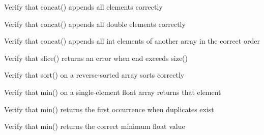 \begin{DoxyRefList}
%
Verify that concat() appends all  elements correctly  
\item[Global \doxylink{test__array_8cpp_acf5b76b0b34a12269c0fa966e7b318df}{TEST\+\_\+F} (\doxylink{classArrayInitTest}{Array\+Init\+Test}, Concat\+Double\+Appends\+Correctly)]\label{test__test000116}%
%
Verify that concat() appends all double elements correctly  
\item[Global \doxylink{test__array_8cpp_a87742c335bea1ccd6f87bbf3bf02f64a}{TEST\+\_\+F} (\doxylink{classArrayInitTest}{Array\+Init\+Test}, Concat\+Int\+Appends\+Correctly)]\label{test__test000115}%
%
Verify that concat() appends all int elements of another array in the correct order  
\item[Global \doxylink{test__array_8cpp_a8672e88636e4a1083f7941bbd4758411}{TEST\+\_\+F} (\doxylink{classArrayInitTest}{Array\+Init\+Test}, Slice\+End\+Exceeds\+Size\+Returns\+Error)]\label{test__test000114}%
%
Verify that slice() returns an error when end exceeds size()  
\item[Global \doxylink{test__array_8cpp_a3c4268741ac142117573f4f962ca871c}{TEST\+\_\+F} (\doxylink{classArrayInitTest}{Array\+Init\+Test}, Sort\+Reverse\+Sorted\+Array)]\label{test__test000141}%
%
Verify that sort() on a reverse-\/sorted array sorts correctly  
\item[Global \doxylink{test__array_8cpp_aeaf0df24ab4d52c170b1872df7c747df}{TEST\+\_\+F} (\doxylink{classArrayInitTest}{Array\+Init\+Test}, Min\+Float\+Single\+Element)]\label{test__test000150}%
%
Verify that min() on a single-\/element float array returns that element  
\item[Global \doxylink{test__array_8cpp_a31fafd54e0a687f76f429020072b05a1}{TEST\+\_\+F} (\doxylink{classArrayInitTest}{Array\+Init\+Test}, Min\+Float\+With\+Duplicates\+Returns\+First)]\label{test__test000149}%
%
Verify that min() returns the first occurrence when duplicates exist  
\item[Global \doxylink{test__array_8cpp_adc2fe36ec7ece65d899d2ecc3e7afae9}{TEST\+\_\+F} (\doxylink{classArrayInitTest}{Array\+Init\+Test}, Min\+Float\+Returns\+Correct\+Value)]\label{test__test000148}%
%
Verify that min() returns the correct minimum float value  
\item[Global \doxylink{test__array_8cpp_a6df6894d9cd7c95e2142a31559b8518a}{TEST\+\_\+F} (\doxylink{classArrayInitTest}{Array\+Init\+Test}, Sort\+Ascending\+Then\+Descending\+Produces\+Reverse)]\label{test__test000147}%

\end{DoxyRefList}

